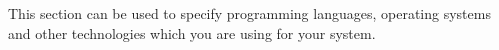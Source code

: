 This section can be used to specify programming languages, operating systems and other technologies
which you are using for your system.